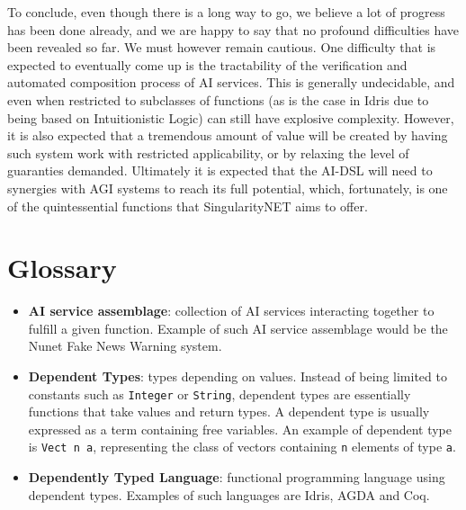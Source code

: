 \documentclass[]{report}
\begin{document}
To conclude, even though there is a long way to go, we believe a lot
of progress has been done already, and we are happy to say that no
profound difficulties have been revealed so far.  We must however
remain cautious.  One difficulty that is expected to eventually come
up is the tractability of the verification and automated composition
process of AI services.  This is generally undecidable, and even when
restricted to subclasses of functions (as is the case in Idris due to
being based on Intuitionistic Logic) can still have explosive
complexity.  However, it is also expected that a tremendous amount of
value will be created by having such system work with restricted
applicability, or by relaxing the level of guaranties demanded.
Ultimately it is expected that the AI-DSL will need to synergies with
AGI systems to reach its full potential, which, fortunately, is one of
the quintessential functions that SingularityNET aims to offer.

\appendix
\chapter{Glossary}
\begin{itemize}
\item \textbf{AI service assemblage}: collection of AI services
  interacting together to fulfill a given function.  Example of such
  AI service assemblage would be the Nunet Fake News Warning system.
\item \textbf{Dependent Types}: types depending on values.  Instead of
  being limited to constants such as \texttt{Integer} or
  \texttt{String}, dependent types are essentially functions that take
  values and return types.  A dependent type is usually expressed as a
  term containing free variables.  An example of dependent type is
  \texttt{Vect n a}, representing the class of vectors containing
  \texttt{n} elements of type \texttt{a}.
\item \textbf{Dependently Typed Language}: functional programming
  language using dependent types.  Examples of such languages are
  Idris, AGDA and Coq.
\end{itemize}



\end{document}
